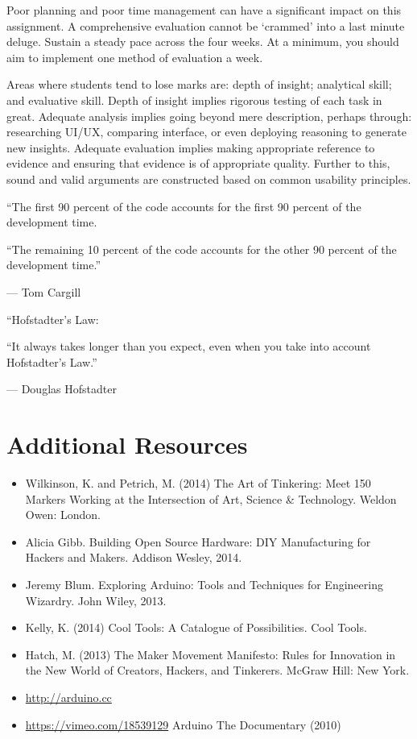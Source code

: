 \documentclass{../fal_assignment}
\begin{document}
Poor planning and poor time management can have a significant impact on this assignment. A comprehensive evaluation cannot be `crammed' into a last minute deluge. Sustain a steady pace across the four weeks. At a minimum, you should aim to implement one method of evaluation a week.

Areas where students tend to lose marks are: depth of insight; analytical skill; and evaluative skill. Depth of insight implies rigorous testing of each task in great. Adequate analysis implies going beyond mere description, perhaps through: researching UI/UX, comparing interface, or even deploying reasoning to generate new insights. Adequate evaluation implies making appropriate reference to evidence and ensuring that evidence is of appropriate quality. Further to this, sound and valid arguments are constructed based on common usability principles. 

\begin{marginquote}
    ``The first 90 percent of the code accounts for the first 90 percent of the development time.
    
    ``The remaining 10 percent of the code accounts for the other 90 percent of the development time.''
    
    --- Tom Cargill
    
    \marginquoterule
    
    ``Hofstadter's Law:
    
    ``It always takes longer than you expect, even when you take into account Hofstadter's Law.''
    
    --- Douglas Hofstadter
\end{marginquote}

\section*{Additional Resources}

\begin{itemize}
    \item Wilkinson, K. and Petrich, M. (2014) The Art of Tinkering: Meet 150 Markers Working at the Intersection of Art, Science \& Technology. Weldon Owen: London.
    \item Alicia Gibb. Building Open Source Hardware: DIY Manufacturing for Hackers and Makers. Addison Wesley, 2014. 
    \item Jeremy Blum. Exploring Arduino: Tools and Techniques for Engineering Wizardry. John Wiley, 2013. 
    \item Kelly, K. (2014) Cool Tools: A Catalogue of Possibilities. Cool Tools.
    \item Hatch, M. (2013) The Maker Movement Manifesto: Rules for Innovation in the New World of Creators, Hackers, and Tinkerers. McGraw Hill: New York.
    \item \url{http://arduino.cc}
    \item \url{https://vimeo.com/18539129} Arduino The Documentary (2010)
\end{itemize}
\end{document}
